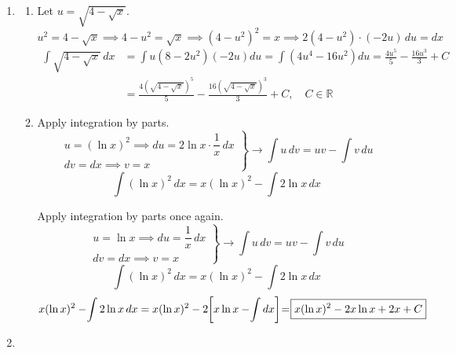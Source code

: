 \documentclass[a4paper, 12pt]{article}
\begin{document}
\begin{enumerate}[leftmargin=*,label=\textbf{\arabic*.}]
\item \begin{enumerate}[leftmargin=*,label=\textbf{\alph*.}]

\item Let $u=\sqrt{4-\sqrt x}$.
\[u^2=4-\sqrt x\implies 4-u^2=\sqrt x\implies\left(4-u^2\right)^2=x\implies2\left(4-u^2\right)\cdot(-2u)\,du=dx\]
\begin{align*}\int\sqrt{4-\sqrt{x}}\,dx&=\int u(8-2u^2)(-2u)du=\int\left(4u^4-16u^2\right)du=\frac{4u^5}5-\frac{16u^3}3+C\\[1em]&=\boxed{\frac{4\left(\sqrt{4-\sqrt x}\right)^5}5-\frac{16\left(\sqrt{4-\sqrt x}\right)^3}3+C,\quad C\in\mathbb{R}}\end{align*}

\item Apply integration by parts.
\[\left.\begin{array}{c}
u=(\ln x)^2\implies du=2\ln x\cdot\dfrac1x\,dx\\
dv=dx\implies v=x
\end{array}\right\}\rightarrow \int u\,dv=uv-\int v\,du\]
\[\int(\ln x)^2\,dx=x(\ln x)^2-\int2\ln x\,dx\]

Apply integration by parts once again.
\[\left.\begin{array}{c}
u=\ln x\implies du=\dfrac1x\,dx\\
dv=dx\implies v=x
\end{array}\right\}\rightarrow \int u\,dv=uv-\int v\,du\]
\[\int(\ln x)^2\,dx=x(\ln x)^2-\int2\ln x\,dx\]
\[x(\ln x)^2-\hspace{-0.2em}\int2\ln x\,dx=x(\ln x)^2-2\hspace{-0.2em}\left[x\ln x-\hspace{-0.2em}\int dx\right]\hspace{-0.2em}=\hspace{-0.2em}\boxed{x(\ln x)^2-2x\ln x+2x+C}\]
\end{enumerate}

\item\leavevmode
\vspace{-1em}
\begin{center}
\end{center}
\end{enumerate}
\end{document}
